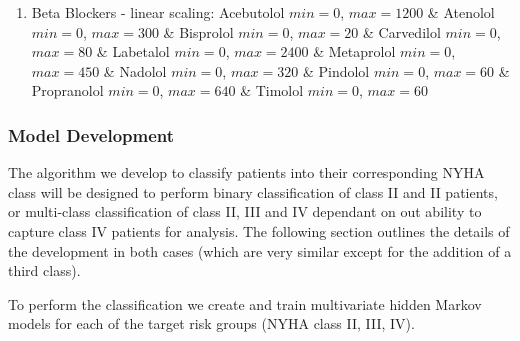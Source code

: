 \documentclass[]{article}
\providecommand{\e}[1]{\ensuremath{\times 10^{#1}}}  %
\begin{document}
\begin{enumerate}
\begin{enumerate}
		\item Beta Blockers - linear scaling: Acebutolol \(min = 0\), \(max = 1200\) \cite{Medscape} \linebreak \& Atenolol \(min = 0\), \(max = 300\)  %
		\& Bisprolol \(min = 0\), \(max = 20\)  %
		\linebreak \& Carvedilol \(min = 0\), \(max = 80\)  %
		\& Labetalol \(min = 0\), \(max = 2400\)  %
		\& Metaprolol \(min = 0\), \(max = 450\)  %
		\& Nadolol \(min = 0\), \(max = 320\)  %
		\linebreak \& Pindolol \(min = 0\), \(max = 60\)  %
		\& Propranolol \(min = 0\), \(max = 640\)  %
		\& Timolol \(min = 0\), \(max = 60\)  %
		\cite{McAuley2017,HeartandStrokeFoundation2017}
		
%		
%		
	\end{enumerate} 
\end{enumerate}

\subsubsection{Model Development}

The algorithm we develop to classify patients into their corresponding NYHA class will be designed to perform binary classification of class II and II patients, or multi-class classification of class II, III and IV dependant on out ability to capture class IV patients for analysis. The following section outlines the details of the development in both cases (which are very similar except for the addition of a third class).

To perform the classification we create and train multivariate hidden Markov models for each of the target risk groups (NYHA class II, III, IV). 
\end{document}
